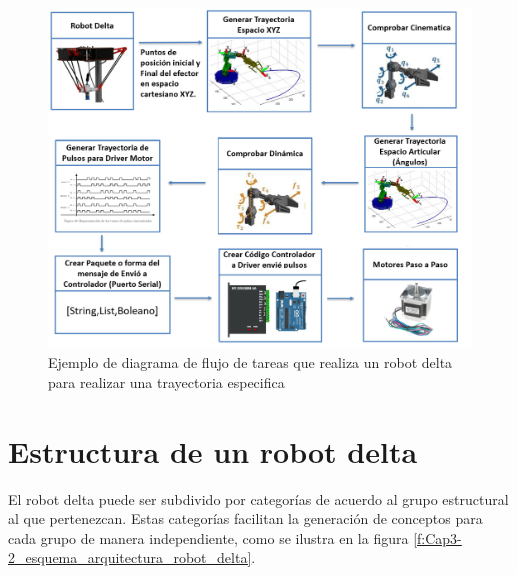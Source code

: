     \begin{figure}[h]
        \centering
        \includegraphics[width=1\linewidth]{Main/Chapter3/Images3/3-1/diagrama-de-flujo-robot.png}
        \caption{Ejemplo de diagrama de flujo de tareas que realiza un robot delta para realizar una trayectoria especifica}
        \label{f:Cap3-1_diagrama_de_flujo_robot_accion}
    \end{figure}
        \newpage
        
\section{Estructura de un robot delta}

    El robot delta puede ser subdivido por categorías de acuerdo al grupo estructural al que pertenezcan. Estas categorías facilitan la generación de conceptos para cada grupo de manera independiente, como se ilustra en la figura \eqref{f:Cap3-2_esquema_arquitectura_robot_delta}.
    
